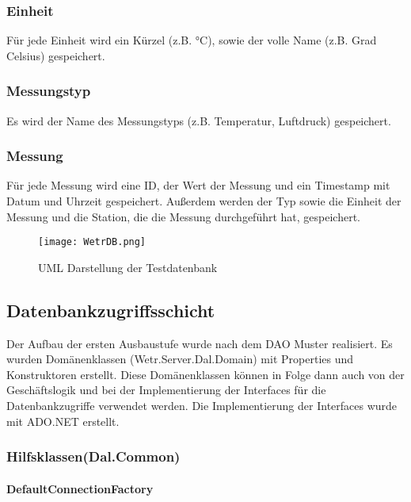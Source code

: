 \subsubsection{Einheit}\label{einheit}

Für jede Einheit wird ein Kürzel (z.B. °C), sowie der volle Name (z.B.
Grad Celsius) gespeichert.


\subsubsection{Messungstyp}\label{messungstyp}

Es wird der Name des Messungstyps (z.B. Temperatur, Luftdruck)
gespeichert.


\subsubsection{Messung}\label{messung}

Für jede Messung wird eine ID, der Wert der Messung und ein Timestamp
mit Datum und Uhrzeit gespeichert. Außerdem werden der Typ sowie die
Einheit der Messung und die Station, die die Messung durchgeführt hat,
gespeichert.

\begin{figure}[!htbp]
	\centering
	\texttt{[image: WetrDB.png]}
	\caption{UML Darstellung der Testdatenbank}
	\label{fig:WetrDB}
\end{figure}

\newpage

\subsection{Datenbankzugriffsschicht}\label{datenbankzugriffsschicht}

Der Aufbau der ersten Ausbaustufe wurde nach dem DAO Muster realisiert.
Es wurden Domänenklassen (Wetr.Server.Dal.Domain) mit Properties und
Konstruktoren erstellt. Diese Domänenklassen können in Folge dann auch
von der Geschäftslogik und bei der Implementierung der Interfaces für
die Datenbankzugriffe verwendet werden. Die Implementierung der
Interfaces wurde mit ADO.NET erstellt.


\subsubsection{Hilfsklassen(Dal.Common)}\label{hilfsklassendal.common}


\paragraph{DefaultConnectionFactory}\label{defaultconnectionfactory}

